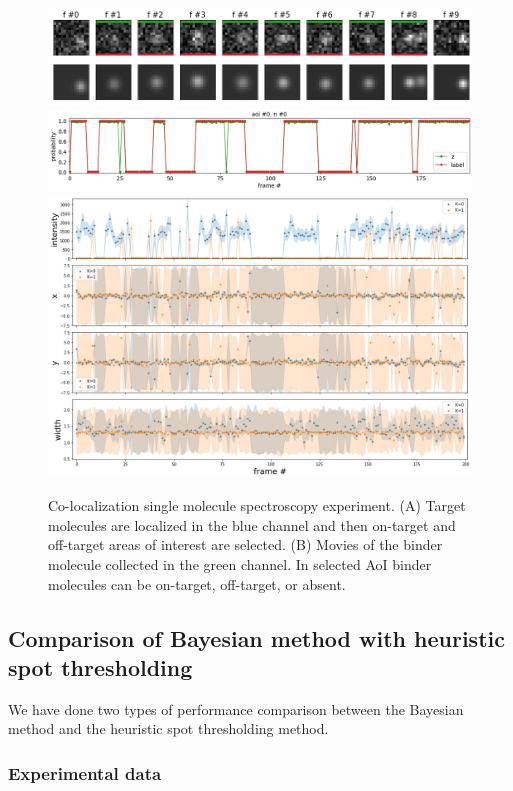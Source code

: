 \begin{figure}
\includegraphics[width=\linewidth]{figures/figure2a.png}
\includegraphics[width=\linewidth]{figures/figure2b.png}
\includegraphics[width=\linewidth]{figures/figure2c.png}
\caption{Co-localization single molecule spectroscopy experiment. (A) Target molecules are localized in the blue channel and then on-target and off-target areas of interest are selected. (B) Movies of the binder molecule collected in the green channel. In selected AoI binder molecules can be on-target, off-target, or absent.}
\label{fig:view}
\end{figure}

\subsection{Comparison of Bayesian method with heuristic spot thresholding}

We have done two types of performance comparison between the Bayesian method and the heuristic spot thresholding method.

\subsubsection{Experimental data}

